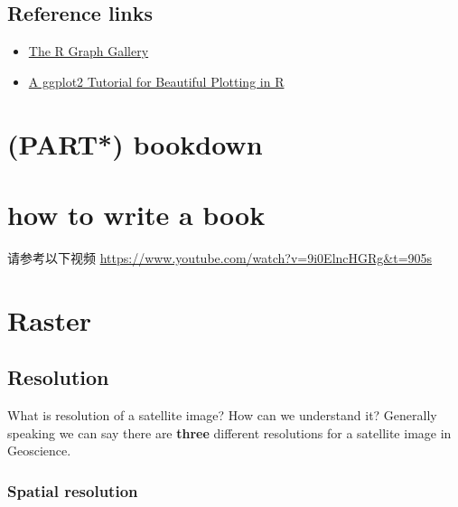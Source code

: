 \documentclass[
]{book}
\providecommand{\tightlist}{%
  \setlength{\itemsep}{0pt}\setlength{\parskip}{0pt}}
\begin{document}
\hypertarget{reference-links}{%
\section{Reference links}\label{reference-links}}

\begin{itemize}
\tightlist
\item
  \href{https://r-graph-gallery.com/}{The R Graph Gallery}
\item
  \href{https://cedricscherer.netlify.app/2019/08/05/a-ggplot2-tutorial-for-beautiful-plotting-in-r}{A ggplot2 Tutorial for Beautiful Plotting in R}\\
\end{itemize}

\hypertarget{part-bookdown}{%
\chapter{(PART*) bookdown}\label{part-bookdown}}

\hypertarget{how-to-write-a-book}{%
\chapter*{how to write a book}\label{how-to-write-a-book}}

请参考以下视频
\url{https://www.youtube.com/watch?v=9i0ElncHGRg\&t=905s}

\hypertarget{raster}{%
\chapter{Raster}\label{raster}}

\hypertarget{resolution}{%
\section{Resolution}\label{resolution}}

What is resolution of a satellite image? How can we understand it? Generally speaking we can say there are \textbf{three} different resolutions for a satellite image in Geoscience.\\

\hypertarget{spatial-resolution}{%
\subsection{\texorpdfstring{\textbf{Spatial resolution}}{Spatial resolution}}\label{spatial-resolution}}
\end{document}
